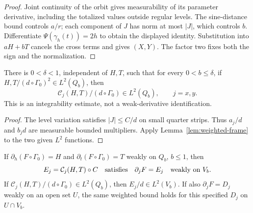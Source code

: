 \begin{proof}
\leanok
Joint continuity of the orbit gives measurability of its parameter
derivative, including the totalized values outside regular levels.
The sine-distance bound controls $a/r$; each component of $J$ has
norm at most $|J|$, which controls $b$.
Differentiate $\Psi(\gamma_h(t))=2h$ to obtain the displayed identity.
Substitution into $aH+bT$ cancels the cross terms and gives $(X,Y)$.
The factor two fixes both the sign and the normalization.
\end{proof}

\begin{lemma}
\label{lem:quarter-inverse-frame-estimate}
\leanok
There is $0<\delta<1$, independent of $H,T$, such that for every
$0<b\le\delta$, if $H,T/(d\circ\Gamma_0)^2\in L^2(Q_b)$, then
\[
 \mathcal C_j(H,T)/(d\circ\Gamma_0)\in L^2(Q_b),\qquad j=x,y.
\]
This is an integrability estimate, not a weak-derivative identification.
\end{lemma}

\begin{proof}
\leanok
The level variation satisfies $|J|\le C/d$ on small quarter strips.
Thus $a_j/d$ and $b_jd$ are measurable bounded multipliers.
Apply Lemma~\ref{lem:weighted-frame} to the two given $L^2$ functions.
\end{proof}

\begin{lemma}
\label{lem:quarter-spatial-reconstruction}
\leanok
If $\partial_h(F\circ\Gamma_0)=H$ and
$\partial_t(F\circ\Gamma_0)=T$ weakly on $Q_b$, $b\le1$, then
\[
 E_j=\mathcal C_j(H,T)\circ C
 \quad\hbox{satisfies}\quad \partial_jF=E_j
 \quad\hbox{weakly on }V_b.
\]
If $\mathcal C_j(H,T)/(d\circ\Gamma_0)\in L^2(Q_b)$, then
$E_j/d\in L^2(V_b)$.
If also $\partial_jF=D_j$ weakly on an open set $U$, the same weighted
bound holds for this specified $D_j$ on $U\cap V_b$.
\end{lemma}

